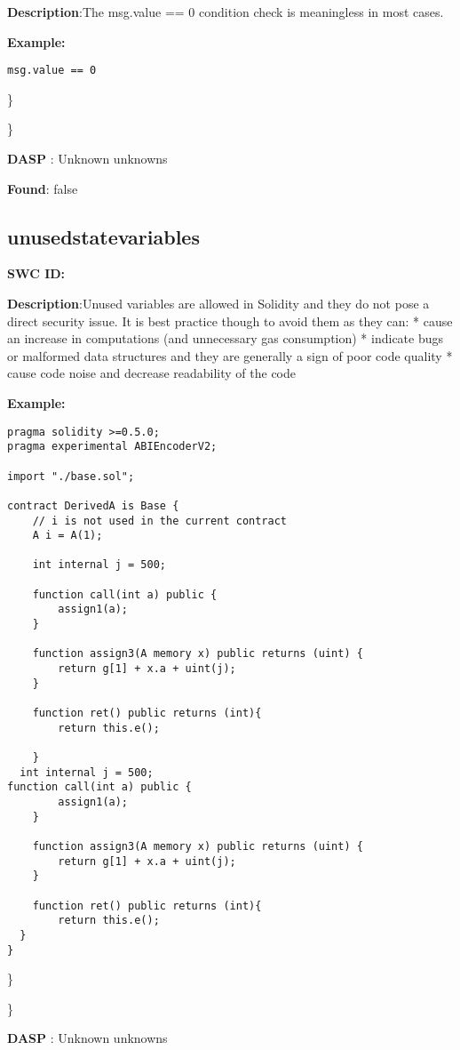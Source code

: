 \documentclass{article}
\begin{document}
\textbf{Description}:The msg.value == 0 condition check is meaningless in most cases.


\textbf{Example:} 
\begin{verbatim}
msg.value == 0

\end{verbatim}\} 

\} 

\textbf{DASP} : Unknown unknowns

\textbf{Found}: false

\subsection{unused\textunderscore state\textunderscore variables} 
\textbf{SWC \textunderscore ID:} 

\textbf{Description}:Unused variables are allowed in Solidity and they do not pose a direct security issue. It is best practice though to avoid them as they can:
* cause an increase in computations (and unnecessary gas consumption)
* indicate bugs or malformed data structures and they are generally a sign of poor code quality
* cause code noise and decrease readability of the code


\textbf{Example:} 
\begin{verbatim}
pragma solidity >=0.5.0;
pragma experimental ABIEncoderV2;

import "./base.sol";

contract DerivedA is Base {
    // i is not used in the current contract
    A i = A(1);

    int internal j = 500;

    function call(int a) public {
        assign1(a);
    }

    function assign3(A memory x) public returns (uint) {
        return g[1] + x.a + uint(j);
    }

    function ret() public returns (int){
        return this.e();

    }
  int internal j = 500;
function call(int a) public {
        assign1(a);
    }

    function assign3(A memory x) public returns (uint) {
        return g[1] + x.a + uint(j);
    }

    function ret() public returns (int){
        return this.e();
  }
}

\end{verbatim}\} 

\} 

\textbf{DASP} : Unknown unknowns
\end{document}
